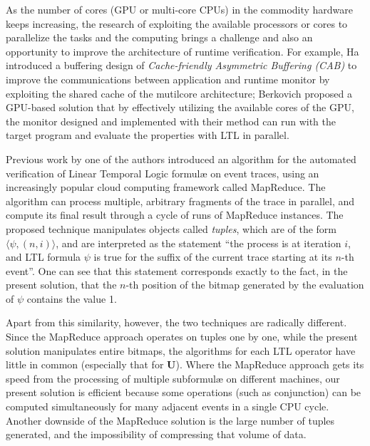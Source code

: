 As the number of cores (GPU or multi-core CPUs) in the commodity hardware keeps increasing, the research of exploiting the available processors or cores to parallelize the tasks and the computing  brings a challenge and also an opportunity to improve the architecture of runtime verification. For example, Ha \etal\@ \citep{ha2009concurrent} introduced a buffering design of \emph{Cache-friendly Asymmetric Buffering (CAB)} to improve the communications between application and runtime monitor by exploiting the shared cache of the mutilcore architecture; Berkovich \etal\@ \citep{DBLP:journals/fmsd/BerkovichBF15} proposed a GPU-based solution that by effectively utilizing the available cores of the GPU, the monitor designed and implemented with their method can run with the target program and evaluate the properties with LTL in parallel.

Previous work by one of the authors \citep{jocasa} introduced an algorithm for the automated verification of Linear Temporal Logic formul\ae{} on event traces, using an increasingly popular cloud computing framework called MapReduce. The algorithm can process multiple, arbitrary fragments of the trace in parallel, and compute its final result through a cycle of runs of MapReduce instances.
The proposed technique manipulates objects called \emph{tuples}, which are  of the form $\langle \psi, (n, i)\rangle$, and are interpreted as the statement ``the process is at iteration $i$, and LTL formula $\psi$ is true for the suffix of the current trace starting at its $n$-th event''. One can see that this statement corresponds exactly to the fact, in the present solution, that the $n$-th position of the bitmap generated by the evaluation of $\psi$ contains the value 1.

Apart from this similarity, however, the two techniques are radically different. Since the MapReduce approach operates on tuples one by one, while the present solution manipulates entire bitmaps, the algorithms for each LTL operator have little in common (especially that for \textbf{U}). Where the MapReduce approach gets its speed from the processing of multiple subformul\ae{} on different machines, our present solution is efficient because some operations (such as conjunction) can be computed simultaneously for many adjacent events in a single CPU cycle. Another downside of the MapReduce solution is the large number of tuples generated, and the impossibility of compressing that volume of data.



